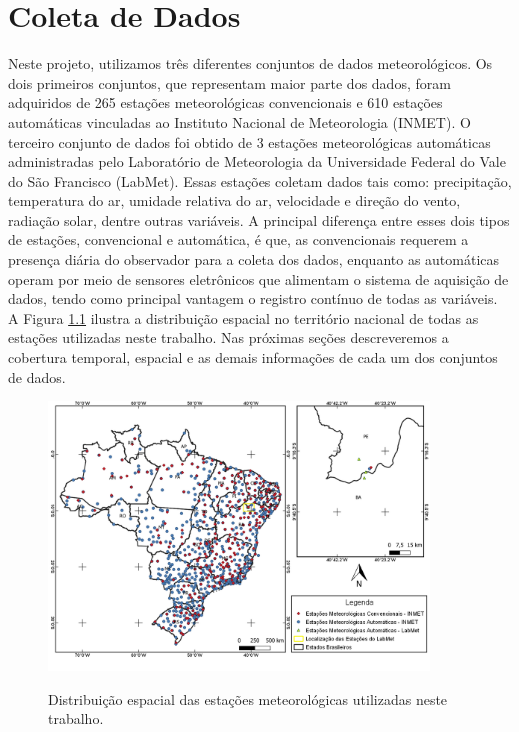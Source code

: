\chapter{Coleta de Dados}
 
Neste projeto, utilizamos três diferentes conjuntos de dados meteorológicos. Os dois primeiros conjuntos, que representam maior parte dos dados, foram adquiridos de 265 estações meteorológicas convencionais e 610 estações automáticas vinculadas ao Instituto Nacional de Meteorologia (INMET). O terceiro conjunto de dados foi obtido de 3 estações meteorológicas automáticas administradas pelo Laboratório de Meteorologia da Universidade Federal do Vale do São Francisco (LabMet). Essas estações coletam dados tais como: precipitação, temperatura do ar, umidade relativa do ar, velocidade e direção do vento, radiação solar, dentre outras variáveis. A principal diferença entre esses dois tipos de estações, convencional e automática, é que, as convencionais requerem a presença diária do observador para a coleta dos dados, enquanto as automáticas operam por meio de sensores eletrônicos que alimentam o sistema de aquisição de dados, tendo como principal vantagem o registro contínuo de todas as variáveis. A Figura \ref{figura_estacoes} ilustra a distribuição espacial no território nacional de todas as estações utilizadas neste trabalho. Nas próximas seções descreveremos a cobertura temporal, espacial e as demais informações de cada um dos conjuntos de dados. 

\begin{figure}[H]
    \centering
    \caption{Distribuição espacial das estações meteorológicas utilizadas neste trabalho.}
    \includegraphics[width=0.9\textwidth]{figuras/espacializacao_estacoes.png}
    \label{figura_estacoes}
\end{figure}

